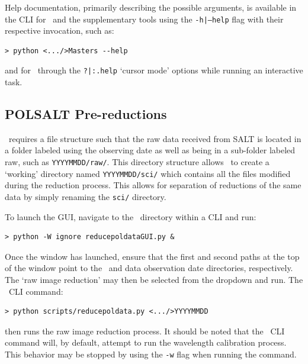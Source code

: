 Help documentation, primarily describing the possible arguments, is available in the \gls{CLI} for \polsalt\ and the supplementary tools using the \texttt{-h|--help} flag with their respective invocation, such as:

\begin{verbatim}> python <.../>Masters --help\end{verbatim}

\noindent and for \iraf\ through the \texttt{?|:.help} `cursor mode' options while running an interactive task.


\subsection{POLSALT Pre-reductions}\label{subsec:reduc_pre}

\prgph

\polsalt\ requires a file structure such that the raw data received from \gls{SALT} is located in a folder labeled using the observing date as well as being in a sub-folder labeled raw, such as \texttt{YYYYMMDD/raw/}. This directory structure allows \polsalt\ to create a `working' directory named \texttt{YYYYMMDD/sci/} which contains all the files modified during the reduction process. This allows for separation of reductions of the same data by simply renaming the \texttt{sci/} directory.
\prgph

To launch the \gls{GUI}, navigate to the \polsalt\ directory within a \gls{CLI} and run:

\begin{verbatim}> python -W ignore reducepoldataGUI.py &\end{verbatim}

\noindent Once the window has launched, ensure that the first and second paths at the top of the window point to the \polsalt\ and data observation date directories, respectively. The `raw image reduction' may then be selected from the dropdown and run. The \polsalt\ \gls{CLI} command:

\begin{verbatim}> python scripts/reducepoldata.py <.../>YYYYMMDD\end{verbatim}

\noindent then runs the raw image reduction process. It should be noted that the \polsalt\ \gls{CLI} command will, by default, attempt to run the wavelength calibration process. This behavior may be stopped by using the \texttt{-w} flag when running the command.



